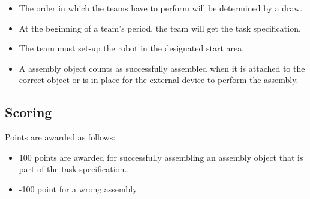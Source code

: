 \begin{itemize}
\item The order in which the teams have to perform will be determined by a draw.
\item At the beginning of a team's period, the team will get the task specification. 
\item The team must set-up the robot in the designated start area.
\item A assembly object counts as successfully assembled when it is attached to the correct object or is in place for the external device to perform the assembly.
\end{itemize}


\subsection{Scoring}
Points are awarded as follows:

\begin{itemize}
\item 100 points are awarded for successfully assembling an assembly object that is part of the task specification..
\item -100 point for a wrong assembly
\end{itemize}

